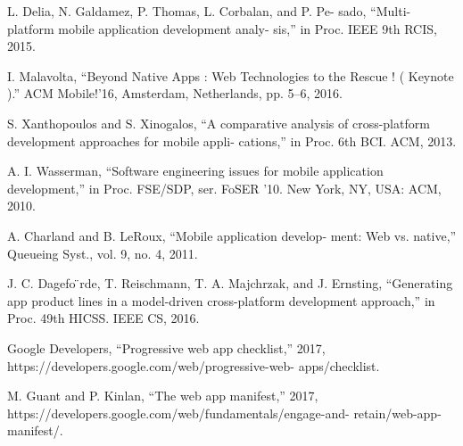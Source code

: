 \documentclass[14pt,a4paper,final]{extreport}
\begin{document}
\begin{thebibliography}{9}
{\fontsize{13pt}{8.4pt}\selectfont L. Delia, N. Galdamez, P. Thomas, L. Corbalan, and P. Pe- sado, “Multi-platform mobile application development analy- sis,” in Proc. IEEE 9th RCIS, 2015.\par}\par

{\fontsize{13pt}{8.4pt}\selectfont I. Malavolta, “Beyond Native Apps : Web Technologies to the Rescue ! ( Keynote ).” ACM Mobile!’16, Amsterdam, Netherlands, pp. 5–6, 2016.\par}\par

{\fontsize{13pt}{8.4pt}\selectfont S. Xanthopoulos and S. Xinogalos, “A comparative analysis of cross-platform development approaches for mobile appli- cations,” in Proc. 6th BCI. ACM, 2013.\par}\par

{\fontsize{13pt}{8.4pt}\selectfont A. I. Wasserman, “Software engineering issues for mobile application development,” in Proc. FSE/SDP, ser. FoSER ’10. New York, NY, USA: ACM, 2010.\par}\par

{\fontsize{13pt}{8.4pt}\selectfont A. Charland and B. LeRoux, “Mobile application develop- ment: Web vs. native,” Queueing Syst., vol. 9, no. 4, 2011.\par}\par

{\fontsize{13pt}{8.4pt}\selectfont J. C. Dagefo ̈rde, T. Reischmann, T. A. Majchrzak, and J. Ernsting, “Generating app product lines in a model-driven cross-platform development approach,” in Proc. 49th HICSS. IEEE CS, 2016.\par}\par

{\fontsize{13pt}{8.4pt}\selectfont Google Developers, “Progressive web app checklist,”
2017, https://developers.google.com/web/progressive-web-
apps/checklist.\par}\par

{\fontsize{13pt}{8.4pt}\selectfont M. Guant and P. Kinlan, “The web app manifest,” 2017,
https://developers.google.com/web/fundamentals/engage-and-
retain/web-app-manifest/.\par}\par


\end{thebibliography}
\end{document}
